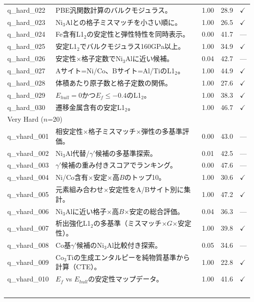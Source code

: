 \begin{longtable}{lp{8.1cm}ccl}
    q\_hard\_022 & PBE汎関数計算のバルクモジュラス。 & 1.00 & 28.9 & $\checkmark$ \\
    q\_hard\_023 & Ni$_3$Alとの格子ミスマッチを小さい順に。 & 1.00 & 26.5 & $\checkmark$ \\
    q\_hard\_024 & Fe含有L1$_2$の安定性と弾性特性を同時表示。 & 0.00 & 41.7 & --- \\
    q\_hard\_025 & 安定L1$_2$でバルクモジュラス160GPa以上。 & 1.00 & 34.9 & $\checkmark$ \\
    q\_hard\_026 & 安定性$\times$格子定数でNi$_3$Alに近い候補。 & 0.04 & 42.7 & --- \\
    q\_hard\_027 & Aサイト=Ni/Co、Bサイト=Al/TiのL1$_2$。 & 1.00 & 44.9 & $\checkmark$ \\
    q\_hard\_028 & 体積あたり原子数と格子定数の関係。 & 1.00 & 27.6 & $\checkmark$ \\
    q\_hard\_029 & $E_{hull} = 0$かつ$E_f \leq -0.4$のL1$_2$。 & 1.00 & 38.3 & $\checkmark$ \\
    q\_hard\_030 & 遷移金属含有の安定L1$_2$。 & 1.00 & 46.7 & $\checkmark$ \\
    \midrule
    \multicolumn{5}{l}{Very Hard ($n$=20)} \\
    \midrule
    q\_vhard\_001 & 相安定性$\times$格子ミスマッチ$\times$弾性の多基準評価。 & 0.00 & 43.0 & --- \\
    q\_vhard\_002 & Ni$_3$Al代替/$\gamma'$候補の多基準探索。 & 0.01 & 42.5 & --- \\
    q\_vhard\_003 & $\gamma'$候補の重み付きスコアでランキング。 & 0.00 & 47.6 & --- \\
    q\_vhard\_004 & Ni/Co含有$\times$安定$\times$高$B$のトップ10。 & 1.00 & 30.6 & $\checkmark$ \\
    q\_vhard\_005 & 元素組み合わせ$\times$安定性をA/Bサイト別に集計。 & 1.00 & 47.2 & $\checkmark$ \\
    q\_vhard\_006 & Ni$_3$Alに近い格子$\times$高$B$$\times$安定の総合評価。 & 0.04 & 36.3 & --- \\
    q\_vhard\_007 & 析出強化L1$_2$の多基準（ミスマッチ$\times$$G$$\times$安定性）。 & 1.00 & 39.8 & $\checkmark$ \\
    q\_vhard\_008 & Co基$\gamma'$候補のNi$_3$Al比較付き探索。 & 0.05 & 34.6 & --- \\
    q\_vhard\_009 & Co$_3$Tiの生成エンタルピーを純物質基準から計算（CTE）。 & 1.00 & 22.8 & $\checkmark$ \\
    q\_vhard\_010 & $E_f$ vs $E_{hull}$の安定性マップデータ。 & 1.00 & 41.6 & $\checkmark$ \\
$$
\end{longtable}
